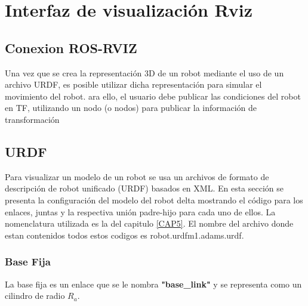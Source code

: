         \newpage
    
    

    \newpage

\section{Interfaz de visualización Rviz}

    

    
    \newpage
       
       
       
     \subsection{Conexion ROS-RVIZ}
        Una vez que se crea la representación 3D de un robot mediante el uso de un archivo URDF, es posible utilizar dicha representación para simular el movimiento del robot. ara ello, el usuario debe publicar las condiciones del robot en TF, utilizando un nodo (o nodos) para publicar la información de transformación 
      \newpage

 
    \subsection{URDF}

        Para visualizar un modelo de un robot se usa un archivos de formato de descripción de robot unificado (URDF) basados en XML. En esta sección se presenta la configuración del modelo del robot delta mostrando el código para los enlaces, juntas y la respectiva unión padre-hijo para cada uno de ellos. La nomenclatura utilizada es la del capitulo \ref{CAP5}. El nombre del archivo donde estan contenidos todos estos codigos es robot.urdfm1.adams.urdf.  
        
       \subsubsection{Base Fija}
        La base fija es un enlace que se le nombra \textbf{"base\_link"} y se representa como un cilindro de radio \textbf{$R_a$}.


